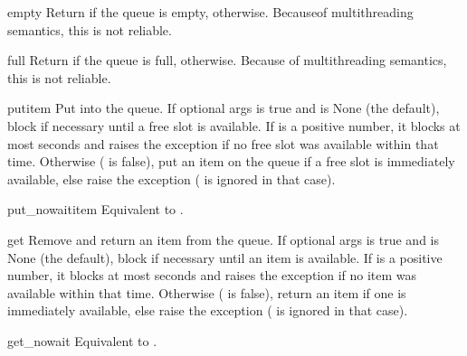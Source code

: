 \begin{methoddesc}{empty}{}
Return  if the queue is empty,  otherwise.
Becauseof multithreading semantics, this is not reliable.
\end{methoddesc}

\begin{methoddesc}{full}{}
Return  if the queue is full,  otherwise.
Because of multithreading semantics, this is not reliable.
\end{methoddesc}

\begin{methoddesc}{put}{item}
Put  into the queue. If optional args  is true
and  is None (the default), block if necessary until a
free slot is available. If  is a positive number, it
blocks at most  seconds and raises the 
exception if no free slot was available within that time.
Otherwise ( is false), put an item on the queue if a free
slot is immediately available, else raise the 
exception ( is ignored in that case).


\end{methoddesc}

\begin{methoddesc}{put_nowait}{item}
Equivalent to .
\end{methoddesc}

\begin{methoddesc}{get}{}
Remove and return an item from the queue. If optional args
 is true and  is None (the default),
block if necessary until an item is available. If  is
a positive number, it blocks at most  seconds and raises
the  exception if no item was available within that
time. Otherwise ( is false), return an item if one is
immediately available, else raise the  exception
( is ignored in that case).


\end{methoddesc}

\begin{methoddesc}{get_nowait}{}
Equivalent to .
\end{methoddesc}
